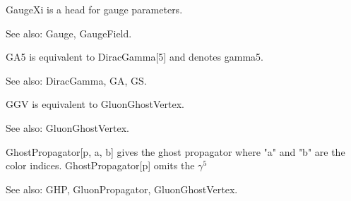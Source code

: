 



GaugeXi is a head for gauge parameters.

See also:  Gauge, GaugeField.



GA5 is equivalent to DiracGamma[5] and denotes gamma5.

See also:  DiracGamma, GA, GS.








GGV is equivalent to GluonGhostVertex.

See also:  GluonGhostVertex.



GhostPropagator[p, a, b] gives the ghost propagator where "a" and "b" are the color indices. GhostPropagator[p] omits the \({{\gamma }^5}\)

See also:  GHP, GluonPropagator, GluonGhostVertex.










